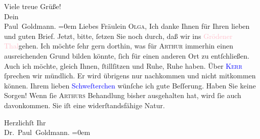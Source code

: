 \pstart
           Viele treue Grüße! {\\[\baselineskip]}Dein {\\[\baselineskip]}\spacefill\mbox{Paul Goldmann.}\pend
           \leftskip=0em{}{\bigskip}
\pstart
           \noindent{}Liebes Fräulein \textsc{Olga}, Ich
               danke Ihnen für Ihren lieben und guten Brief. Jetzt, bitte, ſetzen Sie noch durch,
               daß wir ins \textcolor{pink}{Grödener Thal}{}\ledrightnote{\textcolor{pink}{Val Gardena}}{ }{\pb}gehen. Ich möchte ſehr gern dorthin, was für \textsc{Arthur} immerhin einen ausreichenden Grund bilden könnte,
                   ſich für einen anderen Ort zu
               entſchließen. Auch ich möchte, gleich Ihnen, ſtillſitzen und Ruhe, Ruhe haben. Über
                  \textsc{\textcolor{blue}{Kerr}{}\ledrightnote{\textcolor{blue}{Alfred Kerr}}} ſprechen wir mündlich. Er wird übrigens nur nachkommen und nicht mitkommen
               können. Ihrem lieben \textcolor{blue}{Schweſterchen}{}\ledrightnote{{$\rightarrow$}\textcolor{blue}{Elisabeth Steinrück}} wünſche ich gute Beſſerung. Haben Sie keine Sorgen! Wenn ſie
                  \textsc{Arthurs} Behandlung bisher ausgehalten hat, wird ſie auch
               davonkommen. Sie iſt eine widerſtandsfähige Natur.\pend
           
\pstart
           Herzlichſt Ihr {\\[\baselineskip]}\spacefill\mbox{Dr. Paul Goldmann.}\pend
           \leftskip=0em{}\endnumbering{}
\begin{anhang}
\end{anhang}
      